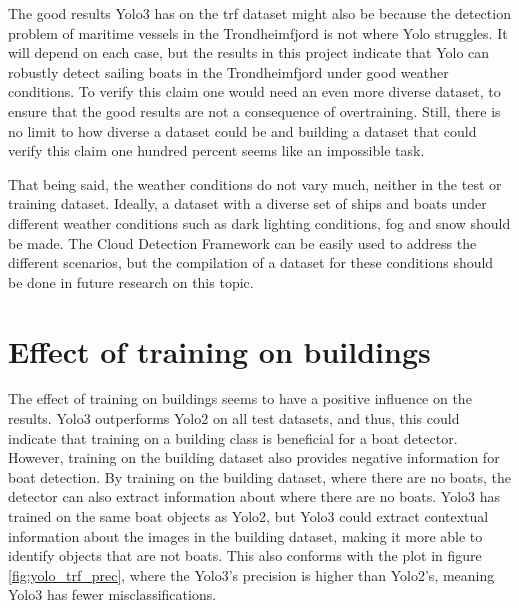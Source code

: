 \vspace{3mm}

The good results Yolo3 has on the trf dataset might also be because the detection problem of maritime vessels in the Trondheimfjord is not where Yolo struggles. It will depend on each case, but the results in this project indicate that Yolo can robustly detect sailing boats in the Trondheimfjord under good weather conditions. To verify this claim one would need an even more diverse dataset, to ensure that the good results are not a consequence of overtraining. Still, there is no limit to how diverse a dataset could be and building a dataset that could verify this claim one hundred percent seems like an impossible task. 

\vspace{3mm}

That being said, the weather conditions do not vary much, neither in the test or training dataset. Ideally, a dataset with a diverse set of ships and boats under different weather conditions such as dark lighting conditions, fog and snow should be made. The Cloud Detection Framework can be easily used to address the different scenarios, but the compilation of a dataset for these conditions should be done in future research on this topic.

\section{Effect of training on buildings}
The effect of training on buildings seems to have a positive influence on the results. Yolo3 outperforms Yolo2 on all test datasets, and thus, this could indicate that training on a building class is beneficial for a boat detector. However, training on the building dataset also provides negative information for boat detection. By training on the building dataset, where there are no boats, the detector can also extract information about where there are no boats. Yolo3 has trained on the same boat objects as Yolo2, but Yolo3 could extract contextual information about the images in the building dataset, making it more able to identify objects that are not boats. This also conforms with the plot in figure \ref{fig:yolo_trf_prec}, where the Yolo3's precision is higher than Yolo2's, meaning Yolo3 has fewer misclassifications.

